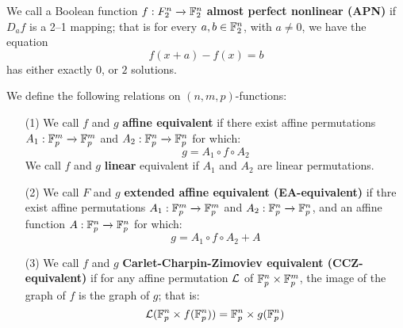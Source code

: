 \begin{definition}
  We call a Boolean function $f:F_2^n \xrightarrow{} \mathbb{F}_2^n$ \textbf{almost
  perfect nonlinear (APN)} if $D_a{f}$ is a 2--1 mapping; that is for every
  $a,b \in \mathbb{F}_2^n$, with $a \neq 0$, we have the equation
  \begin{equation*}
    f(x+a)-f(x)=b
  \end{equation*}
  has either exactly $0$, or  $2$ solutions.
\end{definition}

\begin{definition}
  We define the following relations on $(n,m,p)$-functions:
  \begin{enumerate}
    \item[(1)] We call $f$ and $g$ \textbf{affine equivalent} if there exist
      affine permutations $A_1:\mathbb{F}_p^m \xrightarrow{} \mathbb{F}_p^m$ and $A_2:\mathbb{F}_p^n
      \xrightarrow{} \mathbb{F}_p^n$ for which:
      \begin{equation*}
        g=A_1 \circ f \circ A_2
      \end{equation*}
      We call $f$ and $g$ \textbf{linear} equivalent if $A_1$ and $A_2$ are
      linear permutations.

    \item[(2)] We call $F$ and $g$ \textbf{extended affine equivalent
      (EA-equivalent)} if thre exist affine permutations $A_1:\mathbb{F}_p^m
      \xrightarrow{} \mathbb{F}_p^m$ and $A_2:\mathbb{F}_p^n \xrightarrow{} \mathbb{F}_p^n$, and an
      affine function $A:\mathbb{F}_p^n \xrightarrow{} \mathbb{F}_p^n$ for which:
      \begin{equation*}
        g=A_1 \circ f \circ A_2+A
      \end{equation*}

    \item[(3)] We call $f$ and $g$ \textbf{Carlet-Charpin-Zimoviev equivalent
      (CCZ-equivalent)} if for any affine permutation $\mathcal{L}$ of  $\mathbb{F}_p^n \times
      \mathbb{F}_p^m$, the image of the graph of $f$ is the graph of $g$; that is:
      \begin{equation*}
        \mathcal{L}(\mathbb{F}_p^n \times f(\mathbb{F}_p^n))=\mathbb{F}_p^n \times g(\mathbb{F}_p^n)
      \end{equation*}
  \end{enumerate}
\end{definition}

